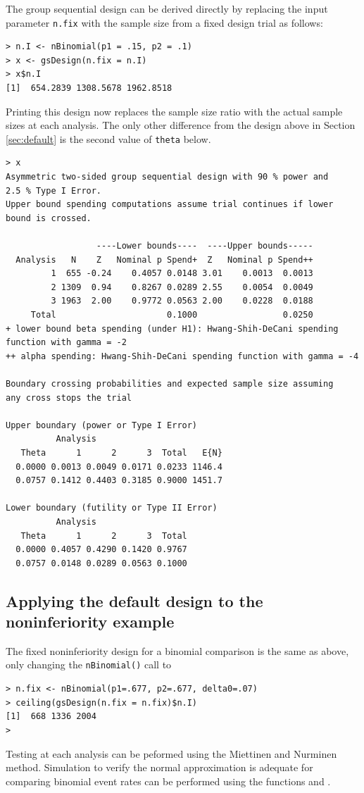 The group sequential design can be derived directly by replacing the input parameter \texttt{n.fix} with the sample size from a fixed design trial as follows:

\begin{verbatim}
> n.I <- nBinomial(p1 = .15, p2 = .1)
> x <- gsDesign(n.fix = n.I)
> x$n.I
[1]  654.2839 1308.5678 1962.8518
\end{verbatim}

Printing this design now replaces the sample size ratio with the actual sample sizes at each analysis. The only other difference from the design above in Section \ref{sec:default} is the second value of \texttt{theta} below.

\begin{verbatim}
> x
Asymmetric two-sided group sequential design with 90 % power and 
2.5 % Type I Error.
Upper bound spending computations assume trial continues if lower 
bound is crossed.

                  ----Lower bounds----  ----Upper bounds-----
  Analysis   N    Z   Nominal p Spend+  Z   Nominal p Spend++
         1  655 -0.24    0.4057 0.0148 3.01    0.0013  0.0013
         2 1309  0.94    0.8267 0.0289 2.55    0.0054  0.0049
         3 1963  2.00    0.9772 0.0563 2.00    0.0228  0.0188
     Total                      0.1000                 0.0250 
+ lower bound beta spending (under H1): Hwang-Shih-DeCani spending 
function with gamma = -2
++ alpha spending: Hwang-Shih-DeCani spending function with gamma = -4

Boundary crossing probabilities and expected sample size assuming 
any cross stops the trial

Upper boundary (power or Type I Error)
          Analysis
   Theta      1      2      3  Total   E{N}
  0.0000 0.0013 0.0049 0.0171 0.0233 1146.4
  0.0757 0.1412 0.4403 0.3185 0.9000 1451.7

Lower boundary (futility or Type II Error)
          Analysis
   Theta      1      2      3  Total
  0.0000 0.4057 0.4290 0.1420 0.9767
  0.0757 0.0148 0.0289 0.0563 0.1000
\end{verbatim}

\bigskip

\subsection{Applying the default design to the noninferiority example}
The fixed noninferiority design for a binomial comparison is the same as above, only changing the \texttt{nBinomial()} call to 
\bigskip
\begin{verbatim}
> n.fix <- nBinomial(p1=.677, p2=.677, delta0=.07)
> ceiling(gsDesign(n.fix = n.fix)$n.I)
[1]  668 1336 2004
>\end{verbatim}
\bigskip
Testing at each analysis can be peformed using the Miettinen and Nurminen \cite{MandN} method.
Simulation to verify the normal approximation is adequate for comparing binomial event rates can be performed using the functions  and .

